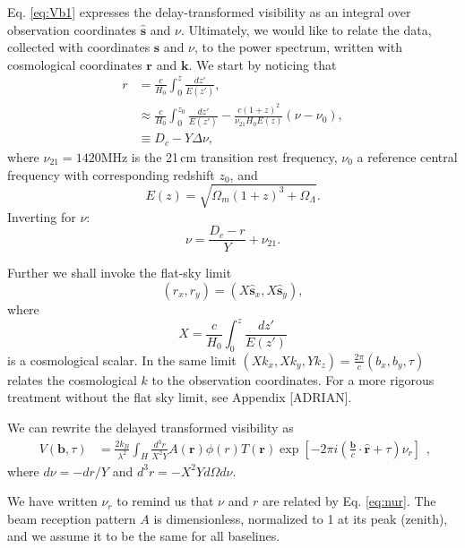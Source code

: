 \documentclass[twocolumn,apj,numberedappendix]{emulateapj}
\renewcommand\[{\begin{equation}}
\renewcommand\]{\end{equation}}
\begin{document}
Eq. \eqref{eq:Vb1} expresses the delay-transformed visibility as
an integral over observation coordinates $\hat{\boldsymbol{s}}$ and $\nu$. Ultimately,
we would like to relate the data, collected with coordinates $\hat{\boldsymbol{s}}$
and $\nu$, to the power spectrum, written with cosmological coordinates
$\boldsymbol{r}$ and $\boldsymbol{k}$. We start by noticing that
\[
\begin{aligned}r & =\frac{c}{H_{0}}\int_{0}^{z}\frac{dz'}{E(z')},\\
 & \approx\frac{c}{H_{0}}\int_{0}^{z_{0}}\frac{dz'}{E(z')}-\frac{c(1+z)^{2}}{\nu_{21}H_{0}E(z)}\left(\nu-\nu_{0}\right),\\
 & \equiv D_{c}-Y\Delta\nu,
\end{aligned}
\]
where $\nu_{21}=1420$MHz is the 21\,cm transition rest frequency, $\nu_{0}$
a reference central frequency with corresponding redshift $z_{0}$,
and 
\[
E(z)=\sqrt{\Omega_{m}(1+z)^{3}+\Omega_{\Lambda}}.
\]
Inverting for $\nu$:
\begin{equation}
\nu=\frac{D_{c}-r}{Y}+\nu_{21}.\label{eq:nur}
\end{equation}

Further we shall invoke the flat-sky limit
\begin{equation}
(r_{x},r_{y})=(X\hat{\boldsymbol{s}}_{x},X\hat{\boldsymbol{s}}_{y}), 
\end{equation}
where
\begin{equation}
X = \frac{c}{H_0}\int_{0}^{z}\frac{dz'}{E(z')}
\end{equation}
is a cosmological scalar. In the same limit $(Xk_{x},Xk_{y},Yk_{z})=\frac{2\pi}{c}(b_{x},b_{y},\tau)$ relates
the cosmological $k$ to the observation coordinates. For a more rigorous treatment without the flat sky limit, see Appendix [ADRIAN]. 

We can rewrite the delayed transformed visibility as 
\small
\[
\begin{aligned}V(\boldsymbol{b},\tau) & =\frac{2k_{B}}{\lambda^{2}}\int_{H}\frac{d^{3}r}{X^{2}Y}A(\boldsymbol{r})\phi(r)T(\boldsymbol{r})\exp\left[-2\pi i\left(\frac{\boldsymbol{b}}{c}\cdot\hat{\boldsymbol{r}}+\tau\right)\nu_{r}\right]\end{aligned},
\]
\normalsize
 where $d\nu=-dr/Y$ and $d^{3}r=-X^{2}Yd\Omega d\nu$. 

We have written $\nu_{r}$ to remind us that $\nu$ and $r$ are related
by Eq. \eqref{eq:nur}. The beam reception pattern $A$ is dimensionless,
normalized to 1 at its peak (zenith), and we assume it to be the same
for all baselines. 
\end{document}
